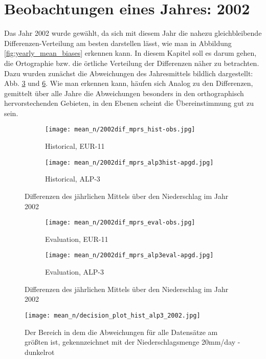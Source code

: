 \section{Beobachtungen eines Jahres: 2002} \label{section:2002}
Das Jahr 2002 wurde gewählt, da sich mit diesem Jahr die nahezu gleichbleibende Differenzen-Verteilung am besten darstellen lässt, wie man in Abbildung \ref{fig:yearly_mean_biases} erkennen kann. In diesem Kapitel soll es darum gehen, die Ortographie bzw. die örtliche Verteilung der Differenzen näher zu betrachten. Dazu wurden zunächst die Abweichungen des Jahresmittels bildlich dargestellt: Abb. \ref{fig:dif_mean_2002_1} und \ref{fig:dif_mean_2002_2}. Wie man erkennen kann, häufen sich Analog zu den Differenzen, gemittelt über alle Jahre die Abweichungen besonders in den orthographisch hervorstechenden Gebieten, in den Ebenen scheint die Übereinstimmung gut zu sein.\\
\begin{figure}[h]
		\begin{subfigure}{0.49\textwidth}
			\texttt{[image: mean\_n/2002dif\_mprs\_hist-obs.jpg]}
			\caption{Historical, EUR-11}
			\label{fig:dif_mean_2002:eur11_hist}
		\end{subfigure}
		\begin{subfigure}{0.49\textwidth}
			\texttt{[image: mean\_n/2002dif\_mprs\_alp3hist-apgd.jpg]}
			\caption{Historical, ALP-3}
			\label{fig:dif_mean_2002:alp3_hist}
		\end{subfigure}
	\caption{Differenzen des jährlichen Mittels über den Niederschlag im Jahr 2002}
	\label{fig:dif_mean_2002_1}
\end{figure}
\begin{figure}
		\begin{subfigure}{0.49\textwidth}
			\texttt{[image: mean\_n/2002dif\_mprs\_eval-obs.jpg]}
			\caption{Evaluation, EUR-11}
			\label{fig:dif_mean_2002:eur11_eval}
		\end{subfigure}
		\begin{subfigure}{0.49\textwidth}
			\texttt{[image: mean\_n/2002dif\_mprs\_alp3eval-apgd.jpg]}
			\caption{Evaluation, ALP-3}
			\label{fig:dif_mean_2002:alp3_eval}
		\end{subfigure}
	\caption{Differenzen des jährlichen Mittels über den Niederschlag im Jahr 2002}
	\label{fig:dif_mean_2002_2}
\end{figure}
\begin{figure}
	\texttt{[image: mean\_n/decision\_plot\_hist\_alp3\_2002.jpg]}
	\caption{Der Bereich in dem die Abweichungen für alle Datensätze am größten ist, gekennzeichnet mit der Niederschlagsmenge 20mm/day - dunkelrot}
	\label{fig:decision_mean_2002}
\end{figure}

